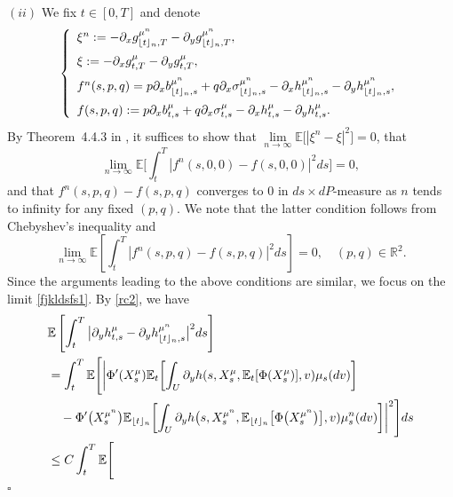 \documentclass[12pt]{article}
\DeclarePairedDelimiter\floor{\lfloor}{\rfloor}
\theoremstyle{named}
\numberwithin{equation}{section}
\newenvironment{Proof}{\removelastskip\par\medskip \noindent{\em Proof.} \rm}{\penalty-20\null\hfill$\square$\par\medbreak}
\newcommand{\real}{\mathbb{R}}
\let\oldcitet=\citet
\renewcommand{\cite}[1]{\textcolor[rgb]{0,0,1}{\oldcitet{#1}}}
\renewcommand{\citet}[1]{\textcolor[rgb]{0,0,1}{\oldcitet{#1}}}
\begin{document}
\begin{Proof}
\noindent
$(ii)$
We fix $t \in [0,T]$ and denote
$$
\left\{
\begin{array}{l}
  \xi^n  := - \partial_xg^{{\mu}^n }_{\floor{t}_{n},T} - \partial_yg^{{\mu}^n }_{\floor{t}_{n},T},
  \medskip
  \\
  \xi := - \partial_xg^{{\mu}}_{t,T} - \partial_yg^{{\mu}}_{t,T},
  \medskip
  \\
  f^n (s,p,q) = p\partial_xb^{{\mu}^n }_{\floor{t}_{n},s}  + q\partial_x \sigma^{{\mu}^n }_{\floor{t}_{n},s}  - \partial_xh^{{\mu}^n }_{\floor{t}_{n},s} - \partial_yh^{{\mu}^n }_{\floor{t}_{n},s},
  \medskip
  \\
f(s,p,q) := p\partial_xb^{{\mu}}_{t,s}  + q\partial_x \sigma^{{\mu}}_{t,s}  - \partial_xh^{{\mu}}_{t,s} - \partial_yh^{{\mu}}_{t,s}.
\end{array}
\right.
$$
 By Theorem~4.4.3 in \cite{zhangjianfeng}, it suffices to show that
 $\lim\limits_{{n}\to \infty} \mathbb{E}\bigl[ |\xi^n  - \xi |^2 \bigr] = 0$,
 that
\begin{equation}
  \label{fjkldsfs1}
  \lim\limits_{{n}\to \infty} \mathbb{E}\biggl[
  \int_t^T | f^n (s,0,0) - f(s,0,0) |^2 ds \biggr] = 0,
\end{equation}
and that $f^n (s,p,q) - f(s,p,q)$ converges to $0$ in $ds \times dP$-measure
as ${n}$ tends to infinity for any fixed $(p,q)$.
We note that the latter condition follows from
 Chebyshev's inequality
 and
\begin{equation}
  \lim\limits_{{n}\to \infty} \mathbb{E}\left[
  \int_t^T
   |f^n (s,p,q) - f(s,p,q)|^2
  ds \right] = 0,
  \quad
  (p,q)\in \real^2.
\end{equation}
Since the arguments leading to the above conditions are similar, we focus
on the limit \eqref{fjkldsfs1}.
 By \eqref{rc2}, we have
\begin{align}
  &\mathbb{E}\left[
    \int_t^T \big| \partial_yh^{{\mu}}_{t,s} - \partial_yh^{{\mu}^n }_{\floor{t}_{n},s}
  \big|^2 ds\right]
  \nonumber\\
  &= \int_t^T \mathbb{E}\Biggl[
    \biggl|
    \Phi'(X^{{\mu}}_s)\mathbb{E}_t \biggl[ \int_U \partial_yh(s, X^{{\mu}}_s, \mathbb{E}_t [\Phi(X^{{\mu}}_s)], v)  {\mu}_s(dv)\biggr]
      \nonumber\\
      & \quad
      - \Phi'\big(X^{{\mu}^n }_s\big)\mathbb{E}_{\floor{t}_{n}} \biggl[
        \int_U \partial_yh\big(s, X^{{\mu}^n }_s, \mathbb{E}_{\floor{t}_{n}} \big[\Phi\big(X^{{\mu}^n }_s\big)\big], v) {\mu}^n _s(dv)\biggr]
  \biggr|^2\Biggr] ds \nonumber\\
  &\leq C \int_t^T \mathbb{E} \Biggl[

\end{align}
\end{Proof}
\end{document}
